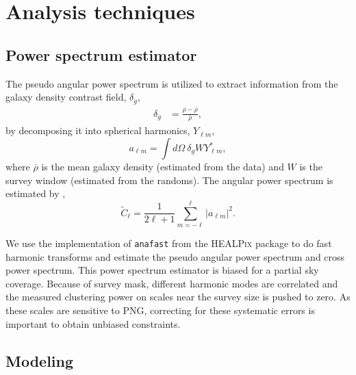 \section{Analysis techniques}
\label{sec:method} 
 
\subsection{Power spectrum estimator}
The pseudo angular power spectrum \citep{hivon2002master} is utilized to extract information from the galaxy density contrast field, $\delta_{g}$, 
\begin{align}\label{eq:delta}
    \delta_{g} &= \frac{\rho- \overline{\rho}}{\overline{\rho}},
\end{align}
by decomposing it into spherical harmonics, $Y_{\ell m}$,
\begin{equation}
        a_{\ell m} = \int d\Omega ~ \delta_{g} W Y^{*}_{\ell m},
\end{equation}
where $\overline{\rho}$ is the mean galaxy density (estimated from the data) and $W$ is the survey window  (estimated from the randoms). The angular power spectrum is estimated by ,
\begin{equation}\label{eq:pusedocell}
        \tilde{C}_{\ell} = \frac{1}{2\ell +1} \sum_{m=-\ell}^{\ell} |a_{\ell m}|^{2}.
\end{equation}

We use the implementation of \texttt{anafast} from the \textsc{HEALPix} package \citep{gorski2005healpix} to do fast harmonic transforms and estimate the pseudo angular power spectrum and cross power spectrum. This power spectrum estimator is biased for a partial sky coverage. Because of survey mask, different harmonic modes are correlated and the measured clustering power on scales near the survey size is pushed to zero. As these scales are sensitive to PNG, correcting for these systematic errors is important to obtain unbiased constraints.

 \subsection{Modeling}

